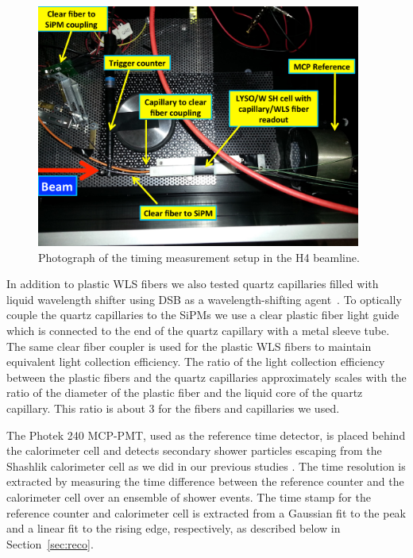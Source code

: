 \begin{figure}[htbp] 
\centering
\includegraphics[width=0.95\textwidth]{figures/ShashlikTBSetupDiagram} 
\caption{Photograph of the timing measurement setup in the H4 beamline.} 
\label{fig:TestbeamSetup} 
\end{figure} 

In addition to plastic WLS fibers we also tested quartz capillaries filled with
liquid wavelength shifter using DSB as a wavelength-shifting
agent~\cite{Baumbaugh:2016vcg}. To optically couple the quartz capillaries to the
SiPMs we use a clear plastic fiber light guide which is connected to the end of
the quartz capillary with a metal sleeve tube. The same clear fiber coupler is
used for the plastic WLS fibers to maintain equivalent light collection
efficiency. The ratio of the light collection efficiency between the plastic
fibers and the quartz capillaries approximately scales with the ratio of the
diameter of the plastic fiber and the liquid core of the quartz capillary. This
ratio is about $3$ for the fibers and capillaries we used.

The Photek 240 MCP-PMT, used as the reference time detector, is placed behind the
calorimeter cell and detects secondary shower particles escaping from the
Shashlik calorimeter cell as we did in our previous studies \cite{Anderson:2015gha}.
The time resolution is extracted by measuring the time difference between the
reference counter and the calorimeter cell over an ensemble of shower events.
The time stamp for the reference counter and calorimeter cell is extracted
from a Gaussian fit to the peak and a linear fit to the rising edge, 
respectively, as described below in Section~\ref{sec:reco}.

